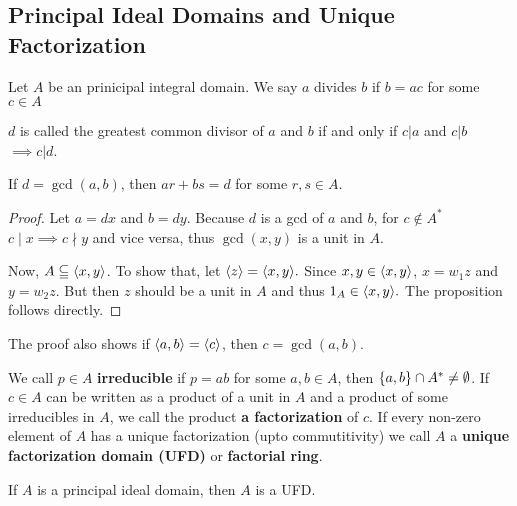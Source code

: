 \subsection*{Principal Ideal Domains and Unique Factorization}
Let $A$ be an prinicipal integral domain.
We say $a$ divides $b$ if $b = ac$ for some $c \in A$ 
\begin{definition}
    $d$ is called the greatest common divisor of $a$ and $b$ if and only if $c | a$ and $c | b$ $\implies c | d$.
\end{definition}

\begin{proposition}
    If $d  = \gcd(a, b)$, then $ar + bs = d$ for some $r, s \in A.$ 
\end{proposition}

\begin{proof}
    Let $a = dx$ and $b = dy$. Because $d$ is a gcd of $a$ and $b$, for $c \notin A^*$ $c \mid x \implies c \nmid y$ and vice versa, thus $\gcd(x, y)$ is a unit in $A$. 

    Now, $A \subseteqq \langle x, y \rangle $. To show that, let $\langle z \rangle = \langle x, y \rangle.$ Since $x, y \in \langle x, y \rangle$, $x = w_1z$ and $y = w_2z$. But then $z$ should be a unit in $A$ and thus $1_A \in \langle x, y \rangle.$ The proposition follows directly.
\end{proof}
The proof also shows if
$\langle a, b \rangle = \langle c \rangle$, then $c = \gcd(a, b).$
\begin{definition}
    We call $p \in A$ \textbf{irreducible} if $p = ab$ for some $a, b \in A$, then $\{a, b\} \cap A^* \neq \emptyset$. If $c \in A$ can be written as a product of a unit in $A$ and a product of some irreducibles in $A$, we call the product \textbf{a factorization} of $c$. If every non-zero element of $A$ has a unique factorization (upto commutitivity) we call $A$ a \textbf{unique factorization domain (UFD)} or \textbf{factorial ring}. 
\end{definition}
\begin{theorem}
    If $A$ is a principal ideal domain, then $A$ is a UFD.
\end{theorem}

